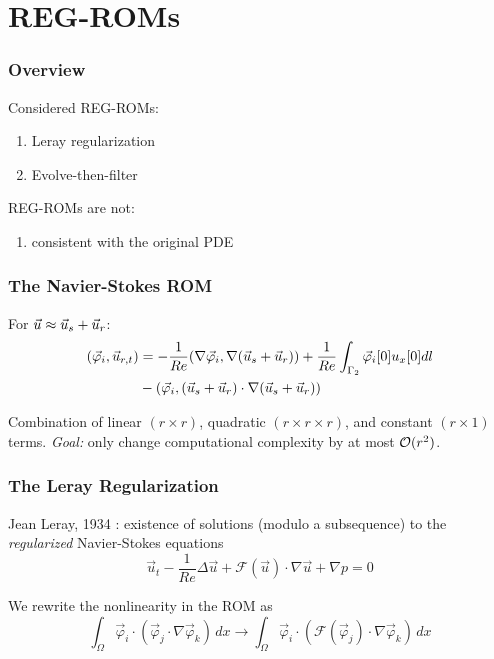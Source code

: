 \documentclass[mathserif]{beamer}
\begin{document}
\section{REG-ROMs}
\begin{frame}
    \frametitle{Overview}
    Considered REG-ROMs:
    \begin{enumerate}
        \item Leray regularization \cite{leray1934}
        \item Evolve-then-filter \cite{LaytonADBook}
    \end{enumerate}
    \pause
    REG-ROMs are not:
    \begin{enumerate}
        \item consistent with the original PDE
    \end{enumerate}
\end{frame}

\begin{frame}
    \frametitle{The Navier-Stokes ROM}
    For \(\vec{u} \approx \vec{u}_s + \vec{u}_r\):
    \begin{equation}
        \begin{aligned}
            (\vec{\varphi}_i, \vec{u}_{r,t})
            &= -\dfrac{1}{Re} (\nabla \vec{\varphi}_i, \nabla (\vec{u}_s + \vec{u}_r))
            + \dfrac{1}{Re} \int_{\Gamma_2} \vec{\varphi}_i[0] u_{x}[0] dl          \\
            &- (\vec{\varphi}_i, (\vec{u}_s + \vec{u}_r) \cdot \nabla (\vec{u}_s + \vec{u}_r))
        \end{aligned}
    \end{equation}

    Combination of linear \((r \times r)\), quadratic \((r \times r \times r)\),
    and constant \((r \times 1)\) terms.
    \pause
    \emph{Goal:} only change computational complexity by at most \(\mathcal{O}(r^2)\).
\end{frame}

\begin{frame}
    \frametitle{The Leray Regularization} Jean Leray, 1934 \cite{leray1934}:
    existence of solutions (modulo a subsequence) to the \emph{regularized}
    Navier-Stokes equations
    \begin{equation}
        \vec{u}_t - \dfrac{1}{Re} \Delta \vec{u}
        + \mathcal{F}(\vec{u}) \cdot \nabla \vec{u}
        + \nabla p = 0
    \end{equation}

    We rewrite the nonlinearity in the ROM as
    \begin{equation}
        \int_\Omega \vec{\varphi}_i \cdot
        (\vec{\varphi}_j \cdot \nabla \vec{\varphi}_k) \,dx
        \rightarrow
        \int_\Omega \vec{\varphi}_i \cdot
        (\mathcal{F}(\vec{\varphi}_j) \cdot \nabla \vec{\varphi}_k) \,dx
    \end{equation}
\end{frame}
\end{document}
